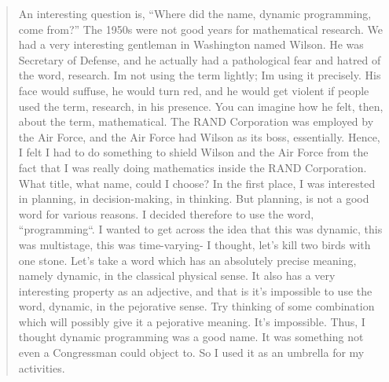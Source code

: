 \documentclass [12pt]{article}
\theoremstyle{definition}
\begin{document}
\begin{quote} 

An interesting question is, ``Where did the name, dynamic programming, come from?'' The 1950s were not good years for mathematical research. We had a very interesting gentleman in Washington named Wilson. He was Secretary of Defense, and he actually had a pathological fear and hatred of the word, research. Im not using the term lightly; Im using it precisely. His face would suffuse, he would turn red, and he would get violent if people used the term, research, in his presence. You can imagine how he felt, then, about the term, mathematical. The RAND Corporation was employed by the Air Force, and the Air Force had Wilson as its boss, essentially. Hence, I felt I had to do something to shield Wilson and the Air Force from the fact that I was really doing mathematics inside the RAND Corporation. What title, what name, could I choose? In the first place, I was interested in planning, in decision-making, in thinking. But planning, is not a good word for various reasons. I decided therefore to use the word, ``programming``. I wanted to get across the idea that this was dynamic, this was multistage, this was time-varying- I thought, let’s kill two birds with one stone. Let’s take a word which has an absolutely precise meaning, namely dynamic, in the classical physical sense. It also has a very interesting property as an adjective, and that is it’s impossible to use the word, dynamic, in the pejorative sense. Try thinking of some combination which will possibly give it a pejorative meaning. It’s impossible. Thus, I thought dynamic programming was a good name. It was something not even a Congressman could object to. So I used it as an umbrella for my activities.
\end{quote}
\end{document}
